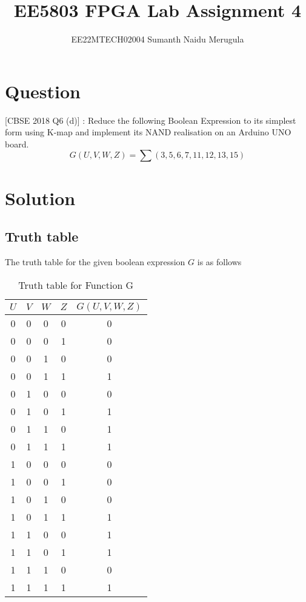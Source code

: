 \documentclass[14pt]{article}
\title{EE5803 FPGA Lab Assignment 4}
\author{EE22MTECH02004  Sumanth Naidu Merugula}
\begin{document}
\maketitle
\section{Question}
[CBSE 2018 Q6 (d)] : Reduce the following Boolean Expression to its simplest form using K-map and implement its NAND realisation on an Arduino UNO board.  
\begin{equation}
G(U,V,W,Z)=\sum(3,5,6,7,11,12,13,15) 
\end{equation}
\section{Solution}
\subsection{Truth table}
The truth table for the given boolean expression $G$ is as follows
\begin{table}[h!]
\centering
\begin{tabular}{|c|c|c|c|c|} 
\hline
$U$ & $V$ & $W$  & $Z$ & $G(U,V,W,Z)$  \\ 
\hline
0 & 0 & 0 & 0 & 0     \\ 
\hline
0 & 0 & 0 & 1 & 0     \\ 
\hline
0 & 0 & 1 & 0 & 0     \\ 
\hline
0 & 0 & 1 & 1 & 1     \\ 
\hline
0 & 1 & 0 & 0 & 0     \\ 
\hline
0 & 1 & 0 & 1 & 1     \\ 
\hline
0 & 1 & 1 & 0 & 1     \\ 
\hline
0 & 1 & 1 & 1 & 1     \\ 
\hline
1 & 0 & 0 & 0 & 0     \\ 
\hline
1 & 0 & 0 & 1 & 0     \\ 
\hline
1 & 0 & 1 & 0 & 0     \\ 
\hline
1 & 0 & 1 & 1 & 1     \\ 
\hline
1 & 1 & 0 & 0 & 1     \\ 
\hline
1 & 1 & 0 & 1 & 1     \\ 
\hline
1 & 1 & 1 & 0 & 0     \\ 
\hline
1 & 1 & 1 & 1 & 1     \\ 
\hline
\end{tabular}
\caption{Truth table for Function G}
\end{table}
\end{document}
